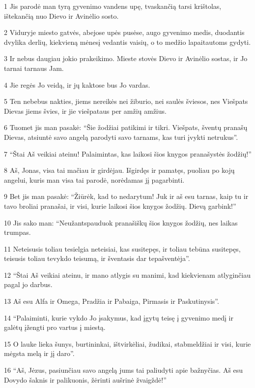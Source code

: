 \par 1 Jis parodė man tyrą gyvenimo vandens upę, tvaskančią tarsi krištolas, ištekančią nuo Dievo ir Avinėlio sosto. 
\par 2 Viduryje miesto gatvės, abejose upės pusėse, augo gyvenimo medis, duodantis dvylika derlių, kiekvieną mėnesį vedantis vaisių, o to medžio lapai­tautoms gydyti. 
\par 3 Ir nebus daugiau jokio prakeikimo. Mieste stovės Dievo ir Avinėlio sostas, ir Jo tarnai tarnaus Jam. 
\par 4 Jie regės Jo veidą, ir jų kaktose bus Jo vardas. 
\par 5 Ten nebebus nakties, jiems nereikės nei žiburio, nei saulės šviesos, nes Viešpats Dievas jiems švies, ir jie viešpataus per amžių amžius. 
\par 6 Tuomet jis man pasakė: “Šie žodžiai patikimi ir tikri. Viešpats, šventų pranašų Dievas, atsiuntė savo angelą parodyti savo tarnams, kas turi įvykti netrukus”. 
\par 7 “Štai Aš veikiai ateinu! Palaimintas, kas laikosi šios knygos pranašystės žodžių!” 
\par 8 Aš, Jonas, visa tai mačiau ir girdėjau. Išgirdęs ir pamatęs, puoliau po kojų angelui, kuris man visa tai parodė, norėdamas jį pagarbinti. 
\par 9 Bet jis man pasakė: “Žiūrėk, kad to nedarytum! Juk ir aš esu tarnas, kaip tu ir tavo broliai pranašai, ir visi, kurie laikosi šios knygos žodžių. Dievą garbink!” 
\par 10 Jis sako man: “Neužantspauduok pranašiškų šios knygos žodžių, nes laikas trumpas. 
\par 11 Neteisusis toliau tesielgia neteisiai, kas susitepęs, ir toliau tebūna susitepęs, teisusis toliau tevykdo teisumą, ir šventasis dar tepašventėja”. 
\par 12 “Štai Aš veikiai ateinu, ir mano atlygis su manimi, kad kiekvienam atlyginčiau pagal jo darbus. 
\par 13 Aš esu Alfa ir Omega, Pradžia ir Pabaiga, Pirmasis ir Paskutinysis”. 
\par 14 “Palaiminti, kurie vykdo Jo įsakymus, kad įgytų teisę į gyvenimo medį ir galėtų įžengti pro vartus į miestą. 
\par 15 O lauke lieka šunys, burtininkai, ištvirkėliai, žudikai, stabmeldžiai ir visi, kurie mėgsta melą ir jį daro”. 
\par 16 “Aš, Jėzus, pasiunčiau savo angelą jums tai paliudyti apie bažnyčias. Aš esu Dovydo šaknis ir palikuonis, žėrinti aušrinė žvaigždė!” 
